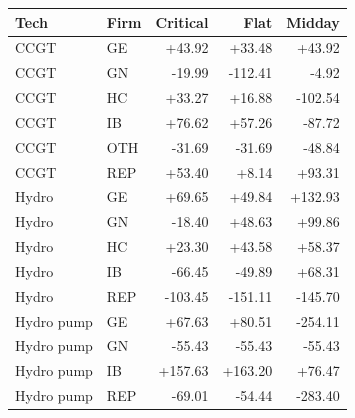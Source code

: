 \begin{tabular}{l l r r r}
\toprule
Tech & Firm & Critical & Flat & Midday \\
\midrule
CCGT & GE & +43.92 & +33.48 & +43.92 \\
CCGT & GN & -19.99 & -112.41 & -4.92 \\
CCGT & HC & +33.27 & +16.88 & -102.54 \\
CCGT & IB & +76.62 & +57.26 & -87.72 \\
CCGT & OTH & -31.69 & -31.69 & -48.84 \\
CCGT & REP & +53.40 & +8.14 & +93.31 \\
Hydro & GE & +69.65 & +49.84 & +132.93 \\
Hydro & GN & -18.40 & +48.63 & +99.86 \\
Hydro & HC & +23.30 & +43.58 & +58.37 \\
Hydro & IB & -66.45 & -49.89 & +68.31 \\
Hydro & REP & -103.45 & -151.11 & -145.70 \\
Hydro pump & GE & +67.63 & +80.51 & -254.11 \\
Hydro pump & GN & -55.43 & -55.43 & -55.43 \\
Hydro pump & IB & +157.63 & +163.20 & +76.47 \\
Hydro pump & REP & -69.01 & -54.44 & -283.40 \\
\bottomrule
\end{tabular}